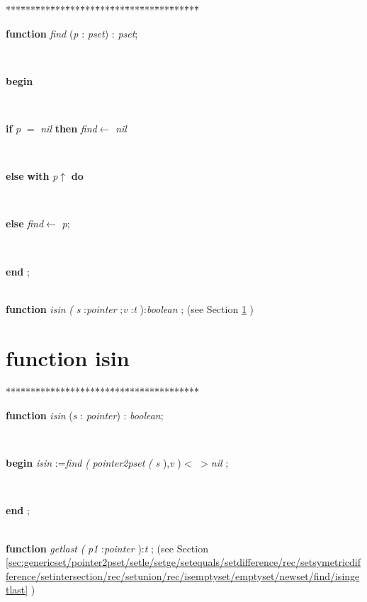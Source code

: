 \documentclass[10pt, a4paper]{article}
\begin{document}
\begin{tabbing}
***\=***\=***\=***\=***\=***\=***\=***\=***\=***\=***\=***\=***\=\kill
\parbox{14cm}{\textsf {\textbf {function } \textsf{\textit{find} (\textit{p} : \textit{pset}) : \textit{pset}}; }}\\
\+\parbox{14cm}{\textsf{\textbf{begin} }}\\
\+\parbox{14cm}{\textsf {\textbf {if } \textsf{\textit{p} $=$ \textit{nil}} \textbf{ then } \textsf{\textit{find}$\leftarrow$ \textit{nil}}}}\\
\+\parbox{14cm}{\textsf {\textbf {else }  \textbf{ with } \textsf{\textit{p}$\uparrow$\textit{}} \textbf{ do } }}\\
\-\<\parbox{14cm}{\textsf {\textbf {else } \textsf{\textit{find}$\leftarrow$ \textit{p}}; }}\\
\<\-\<\-\parbox{14cm}{\textsf{\textbf{end} ;}}\\
\+\textsf{\textbf{function}  \textit{isin} \textit{(} \textit{s} :\textit{pointer} ;\textit{v} :\textit{t} ):\textit{boolean} ;} (see Section \ref{sec:genericset/pointer2pset/setle/setge/setequals/setdifference/rec/setsymetricdifference/setintersection/rec/setunion/rec/isemptyset/emptyset/newset/findisin} )\\
\end{tabbing}
\section{function isin}\label{sec:genericset/pointer2pset/setle/setge/setequals/setdifference/rec/setsymetricdifference/setintersection/rec/setunion/rec/isemptyset/emptyset/newset/findisin}

\begin{tabbing}
***\=***\=***\=***\=***\=***\=***\=***\=***\=***\=***\=***\=***\=\kill
\parbox{14cm}{\textsf {\textbf {function } \textsf{\textit{isin} (\textit{s} : \textit{pointer}) : \textit{boolean}}; }}\\
\+\parbox{14cm}{\textsf{\textbf{begin}  \textit{isin} :=\textit{find} \textit{(} \textit{pointer2pset} \textit{(} \textit{s} ),\textit{v} )$ \mathrm{<} $ $ \mathrm{>} $\textit{nil} ;}}\\
\<\-\parbox{14cm}{\textsf{\textbf{end} ;}}\\
\+\textsf{\textbf{function}  \textit{getlast} \textit{(} \textit{p1} :\textit{pointer} ):\textit{t} ;} (see Section \ref{sec:genericset/pointer2pset/setle/setge/setequals/setdifference/rec/setsymetricdifference/setintersection/rec/setunion/rec/isemptyset/emptyset/newset/find/isingetlast} )\\
\end{tabbing}
\end{document}
